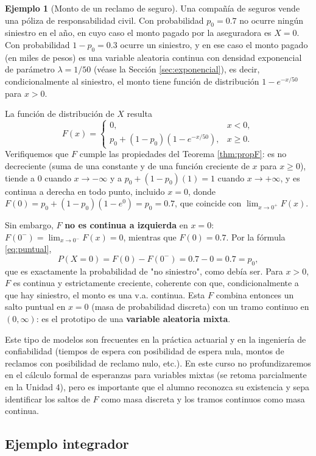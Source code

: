\documentclass[11pt,a4paper]{article}
\theoremstyle{plain}
\theoremstyle{definition}
\newtheorem{ejemplo}[teorema]{Ejemplo}
\theoremstyle{remark}
\begin{document}
\begin{ejemplo}[Monto de un reclamo de seguro]
Una compañía de seguros vende una póliza de responsabilidad civil. Con probabilidad $p_0=0.7$ no ocurre ningún siniestro en el año, en cuyo caso el monto pagado por la aseguradora es $X=0$. Con probabilidad $1-p_0=0.3$ ocurre un siniestro, y en ese caso el monto pagado (en miles de pesos) es una variable aleatoria continua con densidad exponencial de parámetro $\lambda=1/50$ (véase la Sección \ref{sec:exponencial}), es decir, condicionalmente al siniestro, el monto tiene función de distribución $1-e^{-x/50}$ para $x>0$.

La función de distribución de $X$ resulta
$$F(x)=\begin{cases}
0, & x<0,\\[2pt]
p_0+(1-p_0)\left(1-e^{-x/50}\right), & x\ge 0.
\end{cases}$$
Verifiquemos que $F$ cumple las propiedades del Teorema \ref{thm:propF}: es no decreciente (suma de una constante y de una función creciente de $x$ para $x\ge0$), tiende a $0$ cuando $x\to-\infty$ y a $p_0+(1-p_0)(1)=1$ cuando $x\to+\infty$, y es continua a derecha en todo punto, incluido $x=0$, donde $F(0)=p_0+(1-p_0)(1-e^0)=p_0=0.7$, que coincide con $\lim_{x\to0^+}F(x)$.

Sin embargo, $F$ \textbf{no es continua a izquierda} en $x=0$: $F(0^-)=\lim_{x\to 0^-}F(x)=0$, mientras que $F(0)=0.7$. Por la fórmula \eqref{eq:puntual},
$$P(X=0)=F(0)-F(0^-)=0.7-0=0.7=p_0,$$
que es exactamente la probabilidad de "no siniestro", como debía ser. Para $x>0$, $F$ es continua y estrictamente creciente, coherente con que, condicionalmente a que hay siniestro, el monto es una v.a. continua. Esta $F$ combina entonces un salto puntual en $x=0$ (masa de probabilidad discreta) con un tramo continuo en $(0,\infty)$: es el prototipo de una \textbf{variable aleatoria mixta}.
\end{ejemplo}

Este tipo de modelos son frecuentes en la práctica actuarial y en la ingeniería de confiabilidad (tiempos de espera con posibilidad de espera nula, montos de reclamos con posibilidad de reclamo nulo, etc.). En este curso no profundizaremos en el cálculo formal de esperanzas para variables mixtas (se retoma parcialmente en la Unidad 4), pero es importante que el alumno reconozca su existencia y sepa identificar los saltos de $F$ como masa discreta y los tramos continuos como masa continua.

\subsection{Ejemplo integrador}
\end{document}
